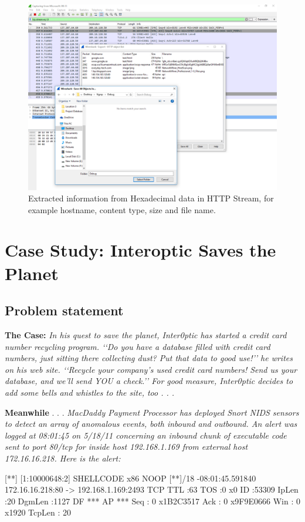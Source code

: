 \documentclass{article}
\begin{document}
\begin{figure}[H]
	\begin{center}
		\includegraphics[width=0.6
\textwidth]{FILECARVING2.png}
	\end{center}
	\caption{Extracted information from Hexadecimal data in HTTP Stream, for example hostname, content type, size and file name.}
	\label{fig:carv2}
\end{figure}


\section{Case Study: Interoptic Saves the Planet}
\subsection{Problem statement}
\textbf{The Case:} \textit{In his quest to save the planet, Inter0ptic has started a credit card number recycling program. ‘‘Do you have a database filled with credit card numbers, just sitting there collecting dust? Put that data to good use!’’ he writes on his web site. ‘‘Recycle your company’s used credit card numbers! Send us your database, and we’ll send YOU a check.’’ For good measure, Inter0ptic decides to add some bells and whistles to the site, too . . .} \cite{davidoff2012network}\newline

\textbf{Meanwhile} . . . \textit{MacDaddy Payment Processor has deployed Snort NIDS sensors to detect an array of anomalous events, both inbound and outbound. An alert was logged at 08:01:45 on 5/18/11 concerning an inbound chunk of executable code sent to port 80/tcp for inside host 192.168.1.169 from external host 172.16.16.218. Here is the alert:}\newline

[**] [1:10000648:2] SHELLCODE x86 NOOP [**]/18 -08:01:45.591840 172.16.16.218:80 -> 192.168.1.169:2493\newline
TCP TTL :63 TOS :0 x0 ID :53309 IpLen :20 DgmLen :1127 DF\newline
*** AP *** Seq : 0 x1B2C3517 Ack : 0 x9F9E0666 Win : 0 x1920 TcpLen : 20\newline
\end{document}
